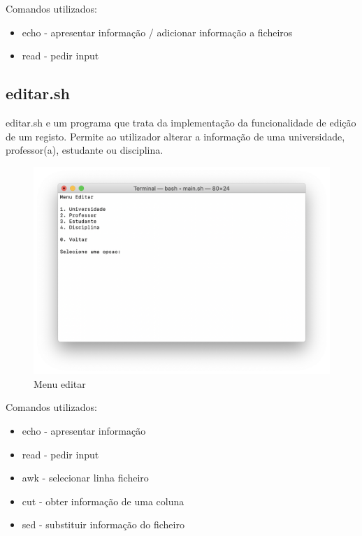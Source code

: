 \documentclass{article}
\begin{document}
Comandos utilizados:

\begin{itemize}
\item echo - apresentar informação / adicionar informação a ficheiros
\item read - pedir input
\end{itemize}

\pagebreak{}
\subsection{editar.sh}
\label{sec:orgd7c4c66}

editar.sh e um programa que trata da implementação da funcionalidade de edição de um registo.
Permite ao utilizador alterar a informação de uma universidade, professor(a), estudante ou disciplina.

\begin{figure}[h]
\centering
\includegraphics[scale=0.4]{images/MenuEditar}
\caption{Menu editar}
\end{figure}

Comandos utilizados:

\begin{itemize}
\item echo - apresentar informação
\item read - pedir input
\item awk - selecionar linha ficheiro
\item cut - obter informação de uma coluna
\item sed - substituir informação do ficheiro
\end{itemize}

\pagebreak{}
\end{document}
